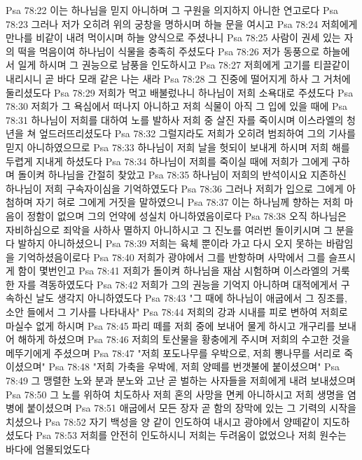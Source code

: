 Psa 78:22  이는 하나님을 믿지 아니하며 그 구원을 의지하지 아니한 연고로다
Psa 78:23  그러나 저가 오히려 위의 궁창을 명하시며 하늘 문을 여시고
Psa 78:24  저희에게 만나를 비같이 내려 먹이시며 하늘 양식으로 주셨나니
Psa 78:25  사람이 권세 있는 자의 떡을 먹음이여 하나님이 식물을 충족히 주셨도다
Psa 78:26  저가 동풍으로 하늘에서 일게 하시며 그 권능으로 남풍을 인도하시고
Psa 78:27  저희에게 고기를 티끌같이 내리시니 곧 바다 모래 같은 나는 새라
Psa 78:28  그 진중에 떨어지게 하사 그 거처에 둘리셨도다
Psa 78:29  저희가 먹고 배불렀나니 하나님이 저희 소욕대로 주셨도다
Psa 78:30  저희가 그 욕심에서 떠나지 아니하고 저희 식물이 아직 그 입에 있을 때에
Psa 78:31  하나님이 저희를 대하여 노를 발하사 저희 중 살진 자를 죽이시며 이스라엘의 청년을 쳐 엎드러뜨리셨도다
Psa 78:32  그럴지라도 저희가 오히려 범죄하여 그의 기사를 믿지 아니하였으므로
Psa 78:33  하나님이 저희 날을 헛되이 보내게 하시며 저희 해를 두렵게 지내게 하셨도다
Psa 78:34  하나님이 저희를 죽이실 때에 저희가 그에게 구하며 돌이켜 하나님을 간절히 찾았고
Psa 78:35  하나님이 저희의 반석이시요 지존하신 하나님이 저희 구속자이심을 기억하였도다
Psa 78:36  그러나 저희가 입으로 그에게 아첨하며 자기 혀로 그에게 거짓을 말하였으니
Psa 78:37  이는 하나님께 향하는 저희 마음이 정함이 없으며 그의 언약에 성실치 아니하였음이로다
Psa 78:38  오직 하나님은 자비하심으로 죄악을 사하사 멸하지 아니하시고 그 진노를 여러번 돌이키시며 그 분을 다 발하지 아니하셨으니
Psa 78:39  저희는 육체 뿐이라 가고 다시 오지 못하는 바람임을 기억하셨음이로다
Psa 78:40  저희가 광야에서 그를 반항하며 사막에서 그를 슬프시게 함이 몇번인고
Psa 78:41  저희가 돌이켜 하나님을 재삼 시험하며 이스라엘의 거룩한 자를 격동하였도다
Psa 78:42  저희가 그의 권능을 기억지 아니하며 대적에게서 구속하신 날도 생각지 아니하였도다
Psa 78:43  "그 때에 하나님이 애굽에서 그 징조를, 소안 들에서 그 기사를 나타내사"
Psa 78:44  저희의 강과 시내를 피로 변하여 저희로 마실수 없게 하시며
Psa 78:45  파리 떼를 저희 중에 보내어 물게 하시고 개구리를 보내어 해하게 하셨으며
Psa 78:46  저희의 토산물을 황충에게 주시며 저희의 수고한 것을 메뚜기에게 주셨으며
Psa 78:47  "저희 포도나무를 우박으로, 저희 뽕나무를 서리로 죽이셨으며"
Psa 78:48  "저희 가축을 우박에, 저희 양떼를 번갯불에 붙이셨으며"
Psa 78:49  그 맹렬한 노와 분과 분노와 고난 곧 벌하는 사자들을 저희에게 내려 보내셨으며
Psa 78:50  그 노를 위하여 치도하사 저희 혼의 사망을 면케 아니하시고 저희 생명을 염병에 붙이셨으며
Psa 78:51  애굽에서 모든 장자 곧 함의 장막에 있는 그 기력의 시작을 치셨으나
Psa 78:52  자기 백성을 양 같이 인도하여 내시고 광야에서 양떼같이 지도하셨도다
Psa 78:53  저희를 안전히 인도하시니 저희는 두려움이 없었으나 저희 원수는 바다에 엄몰되었도다
